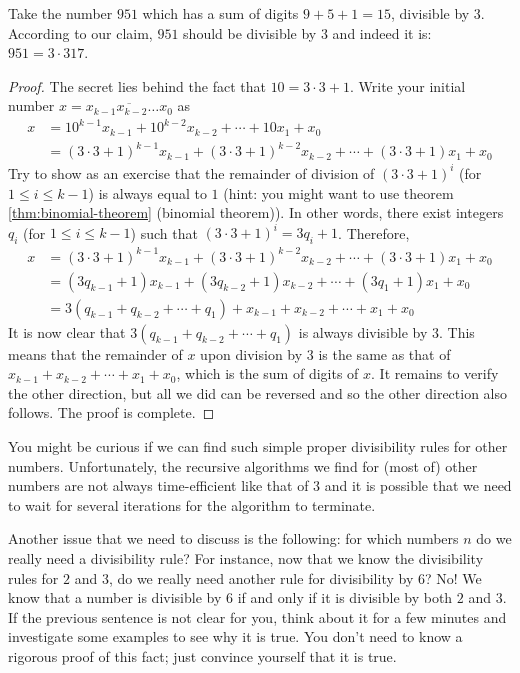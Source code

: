 \documentclass{subfile}
\begin{document}
	\begin{example}
		Take the number $951$ which has a sum of digits $9+5+1=15$, divisible by $3$. According to our claim, $951$ should be divisible by $3$ and indeed it is: $951=3\cdot317$.
	\end{example}

	\begin{proof}
		The secret lies behind the fact that $10 = 3 \cdot 3 + 1$. Write your initial number $x = \overline{x_{k-1} x_{k-2}\ldots x_0}$ as
			\begin{align*}
				x & = 10^{k-1}x_{k-1} + 10^{k-2}x_{k-2} + \cdots + 10x_1 + x_0\\
				&= (3 \cdot 3 + 1)^{k-1}x_{k-1} + (3 \cdot 3 + 1)^{k-2}x_{k-2} + \cdots + (3 \cdot 3 + 1)x_1 + x_0
			\end{align*}
		Try to show as an exercise that the remainder of division of $(3 \cdot 3 + 1)^{i}$ (for $1 \leq i \leq k-1$) is always equal to $1$ (hint: you might want to use theorem \autoref{thm:binomial-theorem} (binomial theorem)). In other words, there exist integers $q_i$ (for $1 \leq i \leq k-1$) such that $(3 \cdot 3 + 1)^{i} = 3q_i + 1$. Therefore,
			\begin{align*}
				x &= (3 \cdot 3 + 1)^{k-1}x_{k-1} + (3 \cdot 3 + 1)^{k-2}x_{k-2} + \cdots + (3 \cdot 3 + 1)x_1 + x_0\\
				&= (3q_{k-1}+1)x_{k-1} + (3q_{k-2}+1)x_{k-2} + \cdots  + (3q_{1}+1)x_{1} + x_{0}\\
				&= 3(q_{k-1} + q_{k-2} + \cdots + q_1)  + x_{k-1} + x_{k-2} + \cdots + x_1 + x_0
			\end{align*}
		It is now clear that $3(q_{k-1} + q_{k-2} + \cdots + q_1)$ is always divisible by $3$. This means that the remainder of $x$ upon division by $3$ is the same as that of $x_{k-1} + x_{k-2} + \cdots + x_1 + x_0$, which is the sum of digits of $x$. It remains to verify the other direction, but all we did can be reversed and so the other direction also follows. The proof is complete.
	\end{proof}

You might be curious if we can find such simple proper divisibility rules for other numbers. Unfortunately, the recursive algorithms we find for (most of) other numbers are not always time-efficient like that of $3$ and it is possible that we need to wait for several iterations for the algorithm to terminate.

Another issue that we need to discuss is the following: for which numbers $n$ do we really need a divisibility rule? For instance, now that we know the divisibility rules for $2$ and $3$, do we really need another rule for divisibility by $6$? No! We know that a number is divisible by $6$ if and only if it is divisible by both $2$ and $3$. If the previous sentence is not clear for you, think about it for a few minutes and investigate some examples to see why it is true. You don't need to know a rigorous proof of this fact; just convince yourself that it is true.
\end{document}
